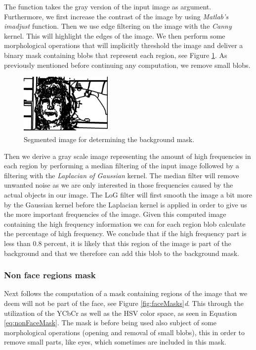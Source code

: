 The function takes the gray version of the input image as argument. Furthermore, we first increase the contrast of the image by using \textit{Matlab's} \textit{imadjust} function. Then we use edge filtering on the image with the \textit{Canny} kernel. This will highlight the edges of the image. We then perform some morphological operations that will implicitly threshold the image and deliver a binary mask containing blobs that represent each region, see Figure \ref{fig:AllBackgroundBlobs}. As previously mentioned before continuing any computation, we remove small blobs.

\begin{figure}[H]
\centering
\includegraphics[width=0.4\textwidth]{img/fd2/AllBackgroundBlobs.png}
\caption{Segmented image for determining the background mask.}
\label{fig:AllBackgroundBlobs}
\end{figure}



Then we derive a gray scale image representing the amount of high frequencies in each region by performing a median filtering of the input image followed by a filtering with the \textit{Laplacian of Gaussian} kernel. The median filter will remove unwanted noise as we are only interested in those frequencies caused by the actual objects in our image. The LoG filter will first smooth the image a bit more by the Gaussian kernel before the Laplacian kernel is applied in order to give us the more important frequencies of the image. Given this computed image containing the high frequency information we can for each region blob calculate the percentage of high frequency. We conclude that if the high frequency part is less than $0.8$ percent, it is likely that this region of the image is part of the background and that we therefore can add this blob to the background mask.

\subsubsection{Non face regions mask}
Next follows the computation of a mask containing regions of the image that we deem will not be part of the face, see Figure \ref{fig:faceMasks}\textit{d}. This through the utilization of the YCbCr as well as the HSV color space, as seen in Equation \ref{eq:nonFaceMask}. The mask is before being used also subject of some morphological operations (opening and removal of small blobs), this in order to remove small parts, like eyes, which sometimes are included in this mask.

